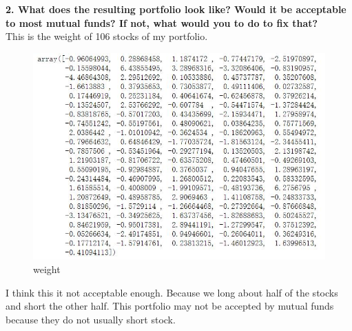 \documentclass{winnower}
\begin{document}
\textbf{2. What does the resulting portfolio look like? Would it be acceptable to most mutual funds? If not, what would you to do to fix that?}
\\

This is the weight of 106 stocks of my portfolio.


\begin{figure}[!h]
\begin{center}
\includegraphics[scale=0.6]{1_5.jpg}
\caption
{weight}
\label{fig:f1}
\end{center}
\end{figure}


I think this it not acceptable enough. Because we long about half of the stocks and short the other half. This portfolio may not be accepted by mutual funds because they do not usually short stock.
\end{document}
